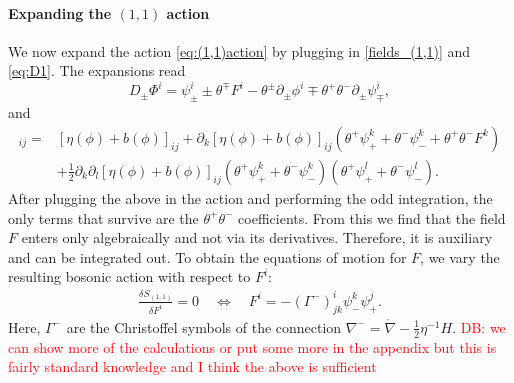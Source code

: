 \documentclass{article}
\newcommand{\lc}{\mathring{\n}}
\newcommand{\p}{\partial}
\newcommand{\n}{\nabla}
\theoremstyle{definition}
\theoremstyle{remark}
\def\david{\textcolor{red}{DB: }\textcolor{red}}
\begin{document}
\paragraph{Expanding the $(1,1)$ action}
We now expand the action \eqref{eq:(1,1)action} by plugging in \eqref{fields_(1,1)} and \eqref{eq:D1}. The expansions read
\[
D_\pm\Phi^i =\psi^i_\pm\pm\theta^\mp F^i-\theta^\pm\p_\pm\phi^i\mp\theta^+\theta^-\p_\pm\psi^i_\mp,
\]
and
\begin{align*}
[\eta(\Phi)+b(\Phi)]_{ij} = & [\eta(\phi)+b(\phi)]_{ij}+\p_k[\eta(\phi)+b(\phi)]_{ij}(\theta^+\psi_+^k+\theta^-\psi_-^k+\theta^+\theta^-F^k)\\
& +\frac{1}{2}\p_k\p_l[\eta(\phi)+b(\phi)]_{ij}(\theta^+\psi_+^k+\theta^-\psi_-^k)(\theta^+\psi_+^l+\theta^-\psi_-^l).
\end{align*}
After plugging the above in the action and performing the odd integration, the only terms that survive are the $\theta^+\theta^-$ coefficients. From this we find that
the field $F$ enters only algebraically and not via its derivatives. Therefore, it is auxiliary and can be integrated out. To obtain the equations of motion for $F$,
we vary the resulting bosonic action with respect to $F^i$:
\begin{align} \label{F_EoM}
\frac{\delta S_{(1,1)}}{\delta F^i}=0\quad \Longleftrightarrow\quad  F^i=-(\Gamma^-)^i_{jk}\psi^k_-\psi^j_+.
\end{align}
Here, $\Gamma^-$ are the Christoffel symbols of the connection $\n^-=\lc-\frac{1}{2}\eta^{-1}H$.
\david{we can show more of the calculations or put some more in the appendix but this is fairly standard knowledge and I think the above is sufficient}
\end{document}
